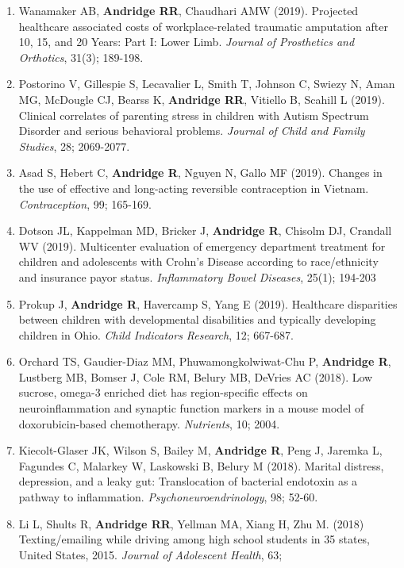 \documentclass[
  english,
  letterpaper,
  DIV=11,
  numbers=noendperiod]{scrartcl}
\begin{document}
\begin{enumerate}
  with lean mass in women without type 2 diabetes. \emph{Menopause},
  26(11); 1311-1317.
\item
  Wanamaker AB, \textbf{Andridge RR}, Chaudhari AMW (2019). Projected
  healthcare associated costs of workplace-related traumatic amputation
  after 10, 15, and 20 Years: Part I: Lower Limb. \emph{Journal of
  Prosthetics and Orthotics}, 31(3); 189-198.
\item
  Postorino V, Gillespie S, Lecavalier L, Smith T, Johnson C, Swiezy N,
  Aman MG, McDougle CJ, Bearss K, \textbf{Andridge RR}, Vitiello B,
  Scahill L (2019). Clinical correlates of parenting stress in children
  with Autism Spectrum Disorder and serious behavioral problems.
  \emph{Journal of Child and Family Studies}, 28; 2069-2077.
\item
  Asad S, Hebert C, \textbf{Andridge R}, Nguyen N, Gallo MF (2019).
  Changes in the use of effective and long-acting reversible
  contraception in Vietnam. \emph{Contraception}, 99; 165-169.
\item
  Dotson JL, Kappelman MD, Bricker J, \textbf{Andridge R}, Chisolm DJ,
  Crandall WV (2019). Multicenter evaluation of emergency department
  treatment for children and adolescents with Crohn's Disease according
  to race/ethnicity and insurance payor status. \emph{Inflammatory Bowel
  Diseases}, 25(1); 194-203
\item
  Prokup J, \textbf{Andridge R}, Havercamp S, Yang E (2019). Healthcare
  disparities between children with developmental disabilities and
  typically developing children in Ohio. \emph{Child Indicators
  Research}, 12; 667-687.
\item
  Orchard TS, Gaudier-Diaz MM, Phuwamongkolwiwat-Chu P, \textbf{Andridge
  R}, Lustberg MB, Bomser J, Cole RM, Belury MB, DeVries AC (2018). Low
  sucrose, omega-3 enriched diet has region-specific effects on
  neuroinflammation and synaptic function markers in a mouse model of
  doxorubicin-based chemotherapy. \emph{Nutrients}, 10; 2004.
\item
  Kiecolt-Glaser JK, Wilson S, Bailey M, \textbf{Andridge R}, Peng J,
  Jaremka L, Fagundes C, Malarkey W, Laskowski B, Belury M (2018).
  Marital distress, depression, and a leaky gut: Translocation of
  bacterial endotoxin as a pathway to inflammation.
  \emph{Psychoneuroendrinology}, 98; 52-60.
\item
  Li L, Shults R, \textbf{Andridge RR}, Yellman MA, Xiang H, Zhu M.
  (2018) Texting/emailing while driving among high school students in 35
  states, United States, 2015. \emph{Journal of Adolescent Health}, 63;

\end{enumerate}
\end{document}
